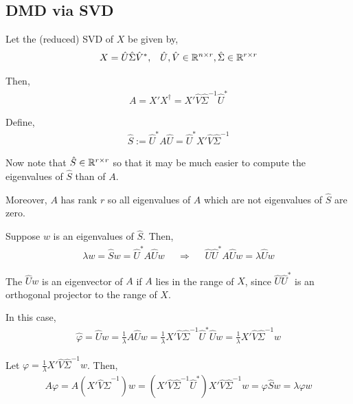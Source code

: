\documentclass[12pt]{article}
\begin{document}
\subsection{DMD via SVD}

Let the (reduced) SVD of \( X \) be given by,
\begin{align*}
    X = \hat{U} \hat{\Sigma}\hat{V}^*, && \hat{U},\hat{V} \in \mathbb{R}^{n\times r}, \hat{\Sigma}\in\mathbb{R}^{r\times r}
\end{align*}


Then,
\begin{align*}
    A = X'X^\dagger = X'\hat{V}\hat{\Sigma}^{-1} \hat{U}^* 
\end{align*}

Define,
\begin{align*}
    \hat{S} := \hat{U}^*A\hat{U} = \hat{U}^*X' \hat{V}\hat{\Sigma}^{-1}
\end{align*}

Now note that \( \hat{S} \in \mathbb{R}^{r\times r} \) so that it may be much easier to compute the eigenvalues of \( \hat{S} \) than of \( A \).

Moreover, \( A \) has rank \( r \) so all eigenvalues of \( A \) which are not eigenvalues of \( \hat{S} \) are zero.

Suppose \( w \) is an eigenvalues of \( \hat{S} \). Then,
\begin{align*}
    \lambda w = \hat{S}w = \hat{U}^*A\hat{U}w 
    &&\Longrightarrow&&
    \hat{U}\hat{U}^* A\hat{U}w = \lambda \hat{U} w
\end{align*}

The \( \hat{U}w \) is an eigenvector of \( A \) if \( A \) lies in the range of \( X \), since \( \hat{U}\hat{U}^* \) is an orthogonal projector to the range of \( X \).

In this case,
\begin{align*}
    \hat{\varphi} = \hat{U} w 
    = \frac{1}{\lambda} A \hat{U} w 
    = \frac{1}{\lambda} X'\hat{V}\hat{\Sigma}^{-1} \hat{U}^* \hat{U} w
    = \frac{1}{\lambda} X'\hat{V}\hat{\Sigma}^{-1} w
\end{align*}

Let \( \varphi = \frac{1}{\lambda} X'\hat{V}\hat{\Sigma}^{-1} w \). Then,
\begin{align*}
    A\varphi
    = A (X'\hat{V}\hat{\Sigma}^{-1})w 
    = (X'\hat{V}\hat{\Sigma}^{-1} \hat{U}^*)X'\hat{V}\hat{\Sigma}^{-1} w
    = \varphi\hat{S} w
    = \lambda \varphi w
\end{align*}
\end{document}
